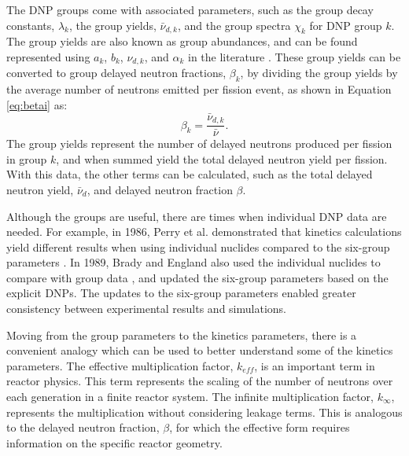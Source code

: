 The \gls{DNP} groups come with associated parameters, such as the group decay constants, $\lambda_k$, the group yields, $\bar{\nu}_{d, k}$, and the group spectra $\chi_k$ for \gls{DNP} group $k$.
The group yields are also known as group abundances, and can be found represented using $a_k$, $b_k$, $\nu_{d,k}$, and $\alpha_k$ in the literature \cite{keepin1957delayed, williams1996choice, ott1985introductory, brady1989delayed}.
These group yields can be converted to group delayed neutron fractions, $\beta_k$, by dividing the group yields by the average number of neutrons emitted per fission event, as shown in Equation \eqref{eq:betai} as:
\begin{equation}
    \beta_k = \frac{\bar{\nu}_{d, k}}{\bar{\nu}}.
    \label{eq:betai}
\end{equation}
The group yields represent the number of delayed neutrons produced per fission in group $k$, and when summed yield the total delayed neutron yield per fission.
With this data, the other terms can be calculated, such as the total delayed neutron yield, $\bar{\nu}_d$, and delayed neutron fraction $\beta$.

Although the groups are useful, there are times when individual \gls{DNP} data are needed.
For example, in 1986, Perry et al. demonstrated that kinetics calculations yield different results when using individual nuclides compared to the six-group parameters \cite{perry1986application}.
In 1989, Brady and England also used the individual nuclides to compare with group data \cite{brady1989delayed}, and updated the six-group parameters based on the explicit \glspl{DNP}.
The updates to the six-group parameters enabled greater consistency between experimental results and simulations.


Moving from the group parameters to the kinetics parameters, there is a convenient analogy which can be used to better understand some of the kinetics parameters.
The effective multiplication factor, $k_{eff}$, is an important term in reactor physics.
This term represents the scaling of the number of neutrons over each generation in a finite reactor system.
The infinite multiplication factor, $k_{\infty}$, represents the multiplication without considering leakage terms.
This is analogous to the delayed neutron fraction, $\beta$, for which the effective form requires information on the specific reactor geometry.

